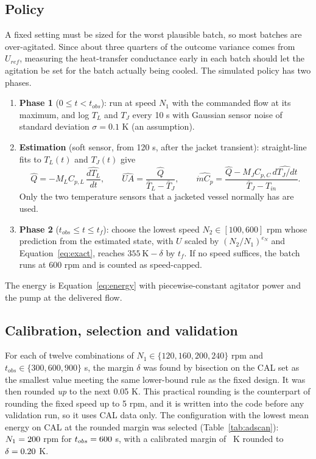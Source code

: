 \documentclass[11pt,letterpaper]{article}
\newcommand{\mdot}{\dot m}
\begin{document}
\subsection{Policy}
A fixed setting must be sized for the worst plausible batch, so most batches are over-agitated. Since about three quarters of the outcome variance comes from \(U_{ref}\), measuring the heat-transfer conductance early in each batch should let the agitation be set for the batch actually being cooled. The simulated policy has two phases.
\begin{enumerate}[leftmargin=*]
\item \textbf{Phase 1} (\(0 \le t < t_{obs}\)): run at speed \(N_1\) with the commanded flow at its maximum, and log \(T_L\) and \(T_J\) every 10 s with Gaussian sensor noise of standard deviation \(\sigma = 0.1\) K (an assumption).
\item \textbf{Estimation} (soft sensor, from 120 s, after the jacket transient): straight-line fits to \(T_L(t)\) and \(T_J(t)\) give
\begin{equation}
\hat Q = -M_LC_{p,L}\,\widehat{\frac{dT_L}{dt}},\qquad \widehat{UA} = \frac{\hat Q}{\bar T_L - \bar T_J},\qquad \widehat{\mdot C_p} = \frac{\hat Q - M_JC_{p,C}\,\widehat{dT_J/dt}}{\bar T_J - T_{in}}. \label{eq:softsensor}
\end{equation}
Only the two temperature sensors that a jacketed vessel normally has are used.
\item \textbf{Phase 2} (\(t_{obs} \le t \le t_f\)): choose the lowest speed \(N_2 \in [100, 600]\) rpm whose prediction from the estimated state, with \(U\) scaled by \((N_2/N_1)^{e_N}\) and Equation~\ref{eq:exact}, reaches \(355\ \mathrm{K} - \delta\) by \(t_f\). If no speed suffices, the batch runs at 600 rpm and is counted as speed-capped.
\end{enumerate}
The energy is Equation~\ref{eq:energy} with piecewise-constant agitator power and the pump at the delivered flow.

\subsection{Calibration, selection and validation}
For each of twelve combinations of \(N_1 \in \{120, 160, 200, 240\}\) rpm and \(t_{obs} \in \{300, 600, 900\}\) s, the margin \(\delta\) was found by bisection on the CAL set as the smallest value meeting the same lower-bound rule as the fixed design. It was then rounded \emph{up} to the next 0.05 K. This practical rounding is the counterpart of rounding the fixed speed up to 5 rpm, and it is written into the code before any validation run, so it uses CAL data only. The configuration with the lowest mean energy on CAL at the rounded margin was selected (Table~\ref{tab:adscan}): \(N_1 = 200\) rpm for \(t_{obs} = 600\) s, with a calibrated margin of \vAdDeltaCal\ K rounded to \(\delta = 0.20\) K.
\end{document}
